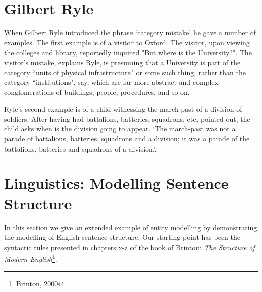 \section {Gilbert Ryle}
When Gilbert Ryle introduced the phrase `category mistake' he gave a number of examples. 
The first example is of a visitor to Oxford. The visitor, upon viewing the colleges and library, reportedly inquired "But where is the University?". 
The visitor's mistake, explains Ryle, is presuming that a University is part of the category ``units of physical infrastructure" or some such thing, rather than the category ``institutions", say, which are far more abstract and complex conglomerations of buildings, people, procedures, and so on.

\vspace{0.5cm}
\vspace{0.5cm}

\noindent Ryle's second example is of a child witnessing the march-past of a division of soldiers. After having had battalions, batteries, squadrons, etc. pointed out, the child asks when is the division going to appear. `The march-past was not a parade of battalions, batteries, squadrons and a division; it was a parade of the battalions, batteries and squadrons of a division.'. \\

\vspace{1cm}
\vspace{1cm}
%
%
\newpage  %
%
%

\section{Linguistics: Modelling Sentence Structure}
\label{modellingSentenceStructure}

\noindent In this section we give an extended example of entity modelling by demonstrating the modelling of English sentence structure. Our starting point has been the syntactic rules presented in chapters x-z of the book of Brinton: \textit{The Structure of Modern English}\footnote{Brinton, 2000}.\\

